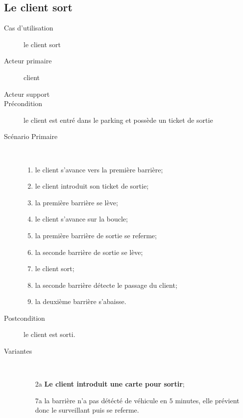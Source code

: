 \documentclass[a4paper]{article}
\begin{document}
\subsection{Le client sort}
\begin{description}
	\item[Cas d'utilisation] le client sort
	\item[Acteur primaire] client
	\item[Acteur support]
	\item[Pr\'econdition] le client est entr\'e dans le parking et poss\`ede un ticket de sortie
	\item[Sc\'enario Primaire] \
	\begin{enumerate}
		\item le client s'avance vers la premi\`ere barri\`ere;
		\item le client introduit son ticket de sortie;
		\item la premi\`ere barri\`ere se l\`eve;
		\item le client s'avance sur la boucle;
		\item la premi\`ere barri\`ere de sortie se referme;
		\item la seconde barri\`ere de sortie se l\`eve;
		\item le client sort;
		\item la seconde barri\`ere d\'etecte le passage du client;
		\item la deuxi\`eme barri\`ere s'abaisse.
	\end{enumerate}
	\item[Postcondition] le client est sorti.
	\item[Variantes] \
	\begin{enumerate}
		\item[2a] \textbf{Le client introduit une carte pour sortir};
		\item[7a] la barri\`ere n'a pas d\'et\'ect\'e de v\'ehicule en $5$ minutes,
			elle pr\'evient donc le surveillant puis se referme.
	\end{enumerate}
\end{description}
\end{document}
